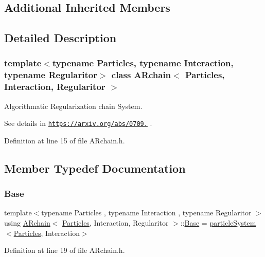 \subsection*{Additional Inherited Members}


\subsection{Detailed Description}
\subsubsection*{template$<$typename Particles, typename Interaction, typename Regularitor$>$\newline
class A\+Rchain$<$ Particles, Interaction, Regularitor $>$}

Algorithmatic Regularization chain System. 

See details in \href{https://arxiv.org/abs/0709.3367}{\tt https\+://arxiv.\+org/abs/0709.} . 

Definition at line 15 of file A\+Rchain.\+h.



\subsection{Member Typedef Documentation}
\mbox{\label{class_a_rchain_a59c554d5529dc8d1558eb263699bfa24}} 
\subsubsection{\texorpdfstring{Base}{Base}}
{\footnotesize\ttfamily template$<$typename Particles , typename Interaction , typename Regularitor $>$ \\
using \mbox{\hyperlink{class_a_rchain}{A\+Rchain}}$<$ \mbox{\hyperlink{struct_particles}{Particles}}, Interaction, Regularitor $>$\+::\mbox{\hyperlink{class_a_rchain_a59c554d5529dc8d1558eb263699bfa24}{Base}} =  \mbox{\hyperlink{classparticle_system}{particle\+System}}$<$\mbox{\hyperlink{struct_particles}{Particles}}, Interaction$>$}



Definition at line 19 of file A\+Rchain.\+h.

\mbox{\label{class_a_rchain_a048c8855064f452c7d6d061531a084ed}} 
